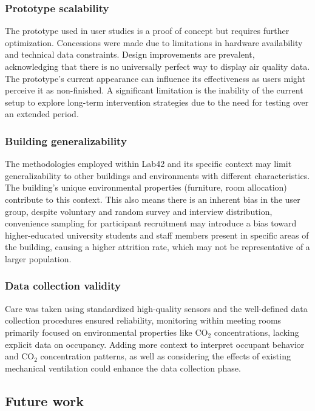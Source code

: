 \subsubsection{Prototype scalability}
The prototype used in user studies is a proof of concept but requires further optimization. Concessions were made due to limitations in hardware availability and technical data constraints. Design improvements are prevalent, acknowledging that there is no universally perfect way to display air quality data. The prototype's current appearance can influence its effectiveness as users might perceive it as non-finished. A significant limitation is the inability of the current setup to explore long-term intervention strategies due to the need for testing over an extended period. 

\subsubsection{Building generalizability}
The methodologies employed within Lab42 and its specific context may limit generalizability to other buildings and environments with different characteristics.  The building's unique environmental properties (furniture, room allocation) contribute to this context. This also means there is an inherent bias in the user group, despite voluntary and random survey and interview distribution, convenience sampling for participant recruitment may introduce a bias toward higher-educated university students and staff members present in specific areas of the building, causing a higher attrition rate, which may not be representative of a larger population. 

\subsubsection{Data collection validity}
Care was taken using standardized high-quality sensors and the well-defined data collection procedures ensured reliability, monitoring within meeting rooms primarily focused on environmental properties like CO$_{2}$ concentrations, lacking explicit data on occupancy. Adding more context to interpret occupant behavior and CO$_{2}$ concentration patterns, as well as considering the effects of existing mechanical ventilation could enhance the data collection phase.

\subsection{Future work}

